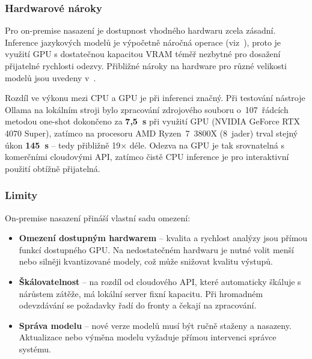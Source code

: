 \subsubsection*{Hardwarové nároky}
\label{subsubsec:deployment-on-premise-hardware}

Pro on-premise nasazení je dostupnost vhodného hardwaru zcela zásadní.
Inference jazykových modelů je výpočetně náročná operace (viz~), proto je využití GPU s dostatečnou kapacitou VRAM téměř nezbytné pro dosažení přijatelné rychlosti odezvy.
Přibližné nároky na hardware pro různé velikosti modelů jsou uvedeny v~.

Rozdíl ve výkonu mezi CPU a GPU je při inferenci značný.
Při testování nástroje Ollama na lokálním stroji bylo zpracování zdrojového souboru o~107~řádcích metodou one-shot dokončeno za \textbf{7,5~s} při využití GPU (NVIDIA GeForce RTX 4070 Super), zatímco na procesoru AMD Ryzen~7~3800X (8~jader) trval stejný úkon \textbf{145~s} -- tedy přibližně 19$\times$ déle.
Odezva na GPU je tak srovnatelná s komerčními cloudovými API, zatímco čistě CPU inference je pro interaktivní použití obtížně přijatelná.

\subsubsection*{Limity}
\label{subsubsec:deployment-on-premise-limits}

On-premise nasazení přináší vlastní sadu omezení:

\begin{itemize}
    \item \textbf{Omezení dostupným hardwarem} -- kvalita a rychlost analýzy jsou přímou funkcí dostupného GPU\@.
    Na nedostatečném hardwaru je nutné volit menší nebo silněji kvantizované modely, což může snižovat kvalitu výstupů.

    \item \textbf{Škálovatelnost} -- na rozdíl od cloudového API, které automaticky škáluje s nárůstem zátěže, má lokální server fixní kapacitu.
    Při hromadném odevzdávání se požadavky řadí do fronty a čekají na zpracování.

    \item \textbf{Správa modelu} -- nové verze modelů musí být ručně staženy a nasazeny.
    Aktualizace nebo výměna modelu vyžaduje přímou intervenci správce systému.
\end{itemize}

